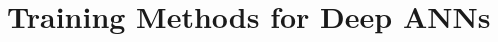 \documentclass[main]{subfiles}
\begin{document}
\section{Training Methods for Deep ANNs}
\end{document}
